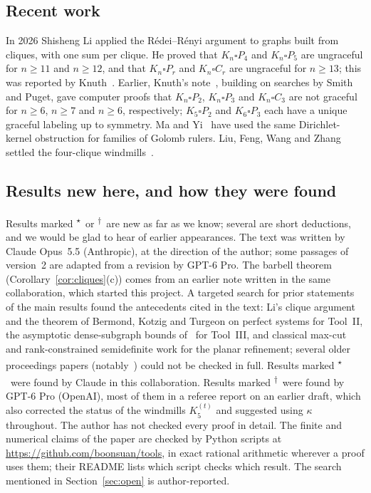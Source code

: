 \documentclass[11pt]{amsart}
\theoremstyle{tplain}
\theoremstyle{tdefinition}
\theoremstyle{tremark}
\newcommand{\new}{\textsuperscript{$\star$}}
\newcommand{\gpt}{\textsuperscript{$\dagger$}}
\begin{document}
\subsection*{Recent work}
In 2026 Shisheng Li applied the R\'edei--R\'enyi argument to graphs built from
cliques, with one sum per clique. He proved that $K_n\square P_4$ and
$K_n\square P_5$ are ungraceful for $n\ge11$ and $n\ge12$, and that
$K_n\square P_r$ and $K_n\square C_r$ are ungraceful for $n\ge13$; this was
reported by Knuth~\cite{knuth-err}. Earlier, Knuth's note~\cite{knuth-coups},
building on searches by Smith and Puget, gave computer proofs that
$K_n\square P_2$, $K_n\square P_3$ and $K_n\square C_3$ are not graceful for
$n\ge6$, $n\ge7$ and $n\ge6$, respectively; $K_5\square P_2$ and $K_6\square P_3$ each have
a unique graceful labeling up to symmetry. Ma and
Yi~\cite{mayi} have used the same Dirichlet-kernel obstruction for families
of Golomb rulers. Liu, Feng, Wang and Zhang settled the four-clique
windmills~\cite{lfwz}.

\subsection*{Results new here, and how they were found}
Results marked \new\ or \gpt\ are new as far as we know; several are short
deductions, and we would be glad to hear of earlier appearances. The text was written by Claude Opus~5.5 (Anthropic),
at the direction of the author; some passages of version~2 are adapted from a
revision by GPT-6 Pro. The barbell
theorem (Corollary~\ref{cor:cliques}(c)) comes from an earlier note written in
the same collaboration, which started this project. A targeted search for prior statements of
the main results found the antecedents cited in the text: Li's clique argument
and the theorem of Bermond, Kotzig and Turgeon on perfect systems for
Tool~II, the asymptotic dense-subgraph bounds of~\cite{fkr,bp} for
Tool~III, and classical max-cut and rank-constrained semidefinite work for the
planar refinement; several older proceedings papers (notably~\cite{bermond,bf})
could not be checked in full. Results marked \new\ were found by Claude in
this collaboration. Results marked \gpt\ were found by
GPT-6 Pro (OpenAI), most of them in a referee report on an earlier draft, which
also corrected the status of the windmills $K_5^{(t)}$ and suggested using
$\kappa$ throughout. The author has not checked every proof in detail.
The finite and numerical claims of the paper are checked by Python scripts
at \url{https://github.com/boonsuan/tools}, in exact rational arithmetic
wherever a proof uses them; their README lists which script checks which
result. The search mentioned
in Section~\ref{sec:open} is author-reported.
\end{document}
